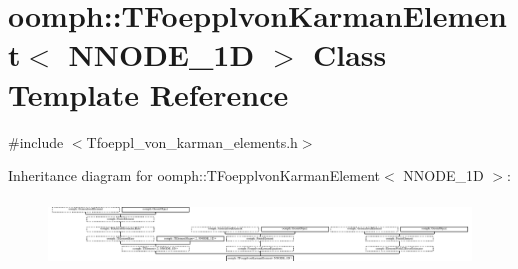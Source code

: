 \hypertarget{classoomph_1_1TFoepplvonKarmanElement}{}\section{oomph\+:\+:T\+Foepplvon\+Karman\+Element$<$ N\+N\+O\+D\+E\+\_\+1D $>$ Class Template Reference}
\label{classoomph_1_1TFoepplvonKarmanElement}


{\ttfamily \#include $<$Tfoeppl\+\_\+von\+\_\+karman\+\_\+elements.\+h$>$}

Inheritance diagram for oomph\+:\+:T\+Foepplvon\+Karman\+Element$<$ N\+N\+O\+D\+E\+\_\+1D $>$\+:\begin{figure}[H]
\begin{center}
\leavevmode
\includegraphics[height=1.812298cm]{classoomph_1_1TFoepplvonKarmanElement}
\end{center}
\end{figure}

